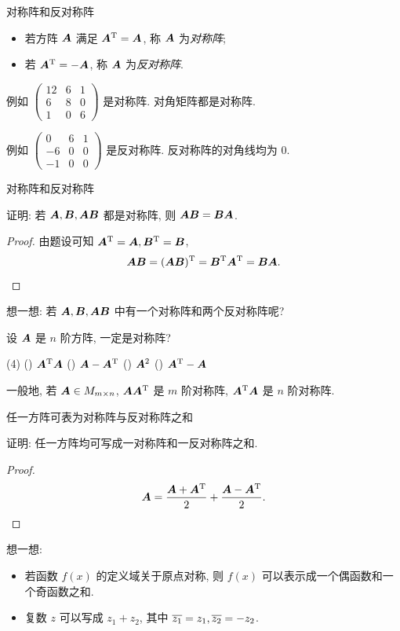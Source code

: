 \begin{frame}{对称阵和反对称阵}
	\onslide<+->
	\begin{definition}
		\begin{itemize}
			\item 若方阵 ${\boldsymbol{A}}$ 满足 ${\boldsymbol{A}}^{\mathrm{T}}={\boldsymbol{A}}$, 称 ${\boldsymbol{A}}$ 为\emph{对称阵};
			\item 若 ${\boldsymbol{A}}^{\mathrm{T}}=-{\boldsymbol{A}}$, 称 ${\boldsymbol{A}}$ 为\emph{反对称阵}.
		\end{itemize}
	\end{definition}
	\onslide<+->
	例如 $\begin{pmatrix}
		12&6&1\\
		6&8&0\\
		1&0&6
	\end{pmatrix}$
	是对称阵.
	\onslide<+->
	对角矩阵都是对称阵.

	\onslide<+->
	例如 $\begin{pmatrix}
		0&6&1\\
		-6&0&0\\
		-1&0&0
	\end{pmatrix}$
	是反对称阵.
	\onslide<+->
	反对称阵的对角线均为 $0$.
\end{frame}


\begin{frame}{对称阵和反对称阵}
	\onslide<+->
	\begin{example}
		证明: 若 ${\boldsymbol{A}},{\boldsymbol{B}},{\boldsymbol{A}}{\boldsymbol{B}}$ 都是对称阵, 则 ${\boldsymbol{A}}{\boldsymbol{B}}={\boldsymbol{B}}{\boldsymbol{A}}$.
	\end{example}
	\onslide<+->
	\begin{proof}
		由题设可知 ${\boldsymbol{A}}^{\mathrm{T}}={\boldsymbol{A}},{\boldsymbol{B}}^{\mathrm{T}}={\boldsymbol{B}}$,
		\[{\boldsymbol{A}}{\boldsymbol{B}}=({\boldsymbol{A}}{\boldsymbol{B}})^{\mathrm{T}}={\boldsymbol{B}}^{\mathrm{T}}{\boldsymbol{A}}^{\mathrm{T}}={\boldsymbol{B}}{\boldsymbol{A}}.\qedhere\]
	\end{proof}
	\onslide<+->
	想一想: 若 ${\boldsymbol{A}},{\boldsymbol{B}},{\boldsymbol{A}}{\boldsymbol{B}}$ 中有一个对称阵和两个反对称阵呢?
	\onslide<+->
	\begin{exercise}
		设 ${\boldsymbol{A}}$ 是 $n$ 阶方阵, 一定是对称阵?
		\begin{taskschoice}(4)
			() ${\boldsymbol{A}}^{\mathrm{T}}{\boldsymbol{A}}$
			() ${\boldsymbol{A}}-{\boldsymbol{A}}^{\mathrm{T}}$
			() ${\boldsymbol{A}}^2$
			() ${\boldsymbol{A}}^{\mathrm{T}}-{\boldsymbol{A}}$
		\end{taskschoice}
	\end{exercise}
	\onslide<+->
	一般地, 若 ${\boldsymbol{A}}\in M_{m\times n}$, ${\boldsymbol{A}}{\boldsymbol{A}}^{\mathrm{T}}$ 是 $m$ 阶对称阵, ${\boldsymbol{A}}^{\mathrm{T}}{\boldsymbol{A}}$ 是 $n$ 阶对称阵.
\end{frame}


\begin{frame}{任一方阵可表为对称阵与反对称阵之和}
	\onslide<+->
	\begin{example}
		证明: 任一方阵均可写成一对称阵和一反对称阵之和.
	\end{example}
	\onslide<+->
	\begin{proof}
		\[{\boldsymbol{A}}=\frac{{\boldsymbol{A}}+{\boldsymbol{A}}^{\mathrm{T}}}2+\frac{{\boldsymbol{A}}-{\boldsymbol{A}}^{\mathrm{T}}}2.\qedhere\]
	\end{proof}
	\onslide<+->
	想一想:
	\begin{itemize}
		\item 若函数 $f(x)$ 的定义域关于原点对称, 则 $f(x)$ 可以表示成一个偶函数和一个奇函数之和.
		\item 复数 $z$ 可以写成 $z_1+z_2$, 其中 $\overline{z_1}=z_1,\overline{z_2}=-z_2$.
	\end{itemize}
\end{frame}

